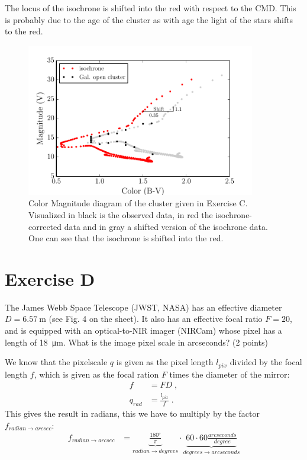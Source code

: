 \documentclass[11pt,a4paper,twoside]{article}
\begin{document}
The locus of the isochrone is shifted into the red with respect to the CMD. 
This is probably due to the age of the cluster as with age the light of the 
stars shifts to the red.


\begin{figure}
\centering
\includegraphics[width=10cm]{pic/CMD}
\caption{Color Magnitude diagram of the cluster given in Exercise C. 
         Visualized in black is the observed data, in red the 
         isochrone-corrected data and in gray a shifted version of the 
         isochrone data. One can see that the isochrone is shifted into the 
         red.}
\label{fig:cmd}
\end{figure}

\section*{Exercise D}
The James Webb Space Telescope (JWST, NASA) has an effective diameter
$D = \SI{6.57}{\meter}$ (see Fig. 4 on the sheet). It also has an effective 
focal ratio $F = 20$, and is equipped with an optical-to-NIR imager (NIRCam) 
whose pixel has a length of \SI{18}{\micro\meter}. What is the image pixel 
scale in arcseconds? (2 points)
\newline

We know that the pixelscale $q$ is given as the pixel length $l_{pix}$ divided 
by the focal length $f$, which is given as the focal ration $F$ times the 
diameter of the mirror:
\begin{align}
    f &= FD \;, \\
    q_{rad} &= \frac{l_{pix}}{f} \;.
\end{align}
This gives the result in radians, this we have to multiply by the factor
$f_{radian \rightarrow arcsec}$:
\begin{align}
    f_{radian \rightarrow arcsec} &= 
    \underbrace{\frac{\ang{180}}{\pi}}_{radian \rightarrow degrees} \cdot 
    \underbrace{60 \cdot 60 \frac{\si{arcseconds}}{\si{degree}}}_{
                degrees \rightarrow arcseconds}
\end{align}
\end{document}
